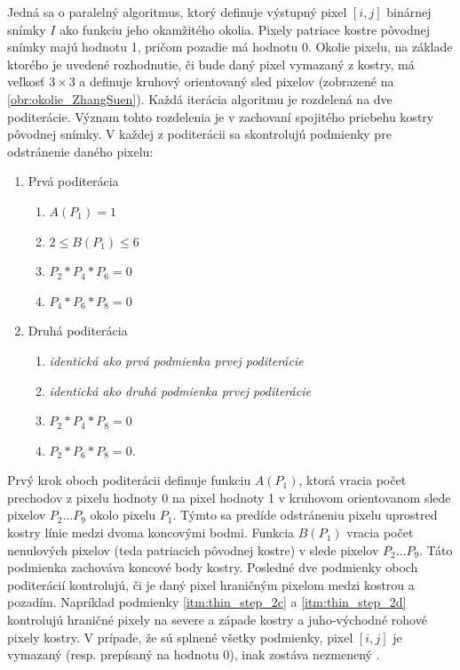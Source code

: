   Jedná sa o paralelný algoritmus, ktorý definuje výstupný pixel $[i,j]$ binárnej snímky $I$ ako funkciu jeho okamžitého okolia. Pixely patriace kostre
  pôvodnej snímky majú hodnotu 1, pričom pozadie má hodnotu 0. Okolie pixelu, na základe ktorého je uvedené rozhodnutie, či bude daný pixel vymazaný z kostry,
  má veľkosť $3 \times 3$ a definuje kruhový orientovaný sled pixelov (zobrazené na \ref{obr:okolie_ZhangSuen}).
  Každá iterácia algoritmu je rozdelená na dve poditerácie. Význam tohto rozdelenia je v zachovaní spojitého priebehu kostry pôvodnej snímky.
  V každej z poditerácii sa skontrolujú podmienky pre odstránenie daného pixelu:
  \begin{enumerate}
    \item Prvá poditerácia \label{itm:thin_step_1}
    \begin{enumerate}
      \item $A(P_1) = 1$  \label{itm:thin_step_1a}
      \item $2 \leq B(P_1) \leq 6$ \label{itm:thin_step_1b}
      \item $P_2 * P_4 * P_6 = 0$ \label{itm:thin_step_1c}
      \item $P_4 * P_6 * P_8 = 0$ \label{itm:thin_step_1d}
    \end{enumerate}
    \item Druhá poditerácia \label{itm:thin_step_2}
    \begin{enumerate}
      \item \emph{identická ako prvá podmienka prvej poditerácie} \label{itm:thin_step_2a}
      \item \emph{identická ako druhá podmienka prvej poditerácie} \label{itm:thin_step_2b}
      \item $P_2 * P_4 * P_8 = 0$ \label{itm:thin_step_2c}
      \item $P_2 * P_6 * P_8 = 0$. \label{itm:thin_step_2d}
    \end{enumerate}
  \end{enumerate}

  Prvý krok oboch poditerácii definuje funkciu $A(P_1)$, ktorá vracia počet prechodov z pixelu hodnoty 0 na pixel hodnoty 1 v kruhovom orientovanom slede
  pixelov $P_2\dots{}P_9$ okolo pixelu $P_1$. Týmto sa predíde odstráneniu pixelu uprostred kostry línie medzi dvoma koncovými bodmi.
  Funkcia $B(P_1)$ vracia počet nenulových pixelov (teda patriacich pôvodnej kostre) v slede pixelov $P_2\dots{}P_9$. Táto podmienka zachováva koncové body
  kostry. Posledné dve podmienky oboch poditerácií kontrolujú, či je daný pixel hraničným pixelom medzi kostrou a pozadím.
  Napríklad podmienky \ref{itm:thin_step_2c} a \ref{itm:thin_step_2d} kontrolujú hraničné pixely na severe a západe kostry a juho-východné rohové pixely kostry.
  V prípade, že sú splnené všetky podmienky, pixel $[i,j]$ je vymazaný (resp. prepísaný na hodnotu 0), inak zostáva nezmenený \cite{ZhangSuen_thinning}.

